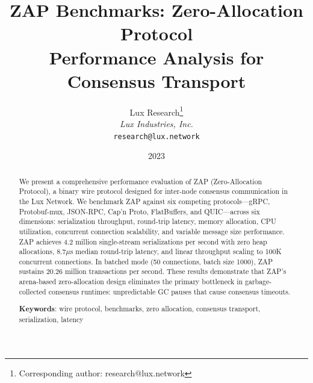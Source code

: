 \documentclass[11pt,letterpaper]{article}
\title{ZAP Benchmarks: Zero-Allocation Protocol\\Performance Analysis for Consensus Transport}
\author{
Lux Research\thanks{Corresponding author: research@lux.network}\\
\textit{Lux Industries, Inc.}\\
\texttt{research@lux.network}
}
\date{2023}
\begin{document}
\luxcoverpage

\begin{abstract}
We present a comprehensive performance evaluation of ZAP (Zero-Allocation Protocol), a binary wire protocol designed for inter-node consensus communication in the Lux Network. We benchmark ZAP against six competing protocols---gRPC, Protobuf-mux, JSON-RPC, Cap'n Proto, FlatBuffers, and QUIC---across six dimensions: serialization throughput, round-trip latency, memory allocation, CPU utilization, concurrent connection scalability, and variable message size performance. ZAP achieves 4.2 million single-stream serializations per second with zero heap allocations, 8.7$\mu$s median round-trip latency, and linear throughput scaling to 100K concurrent connections. In batched mode (50 connections, batch size 1000), ZAP sustains 20.26 million transactions per second. These results demonstrate that ZAP's arena-based zero-allocation design eliminates the primary bottleneck in garbage-collected consensus runtimes: unpredictable GC pauses that cause consensus timeouts.

\textbf{Keywords}: wire protocol, benchmarks, zero allocation, consensus transport, serialization, latency
\end{abstract}

\tableofcontents
\newpage

















\end{document}
